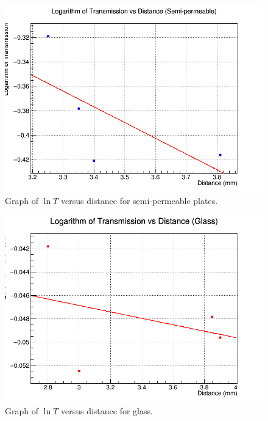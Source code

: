 \documentclass[journal]{IEEEtran}
\begin{document}
\begin{figure}[H]
    \centering
    \includegraphics[width=0.8\linewidth]{../plots/logT_vs_distance_semi_permeable.png}
    \caption{Graph of $\ln T$ versus distance for semi-permeable plates.}
    \label{fig:logT_semi_permeable}
\end{figure}

\begin{figure}[H]
    \centering
    \includegraphics[width=0.8\linewidth]{../plots/logT_vs_distance_glass.png}
    \caption{Graph of $\ln T$ versus distance for glass.}
    \label{fig:logT_glass}
\end{figure}
\end{document}
